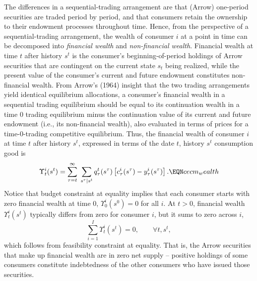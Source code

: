 The differences in a sequential-trading arrangement are that (Arrow)
one-period securities are traded period by period, and that consumers
retain the ownership to their endowment processes throughout time.
Hence, from the perspective of a sequential-trading arrangement, the
wealth of consumer $i$ at a point in time can be decomposed into  {\it financial wealth} and
 {\it non-financial wealth}.
Financial wealth at time $t$ after history $s^t$ is the consumer's
beginning-of-period holdings of Arrow securities that are contingent on
the current state $s_t$ being realized,
while the present value of the consumer's current and future endowment constitutes non-financial
wealth. From Arrow's (1964) insight that the two trading arrangements
yield  identical equilibrium allocations, a consumer's financial wealth
in a sequential trading equilibrium should be equal to its
continuation wealth in a time $0$ trading equilibrium minus the continuation value of
its current and future endowment
(i.e., its non-financial wealth), also evaluated in terms of prices for a time-$0$-trading competitive equilibrium. Thus, the
financial wealth of consumer $i$ at time $t$ after history $s^t$,
expressed in terms of the date $t$, history $s^t$ consumption good is
$$
\Upsilon^i_t(s^t) =
\sum_{\tau=t}^\infty \; \sum_{s^\tau \vert s^t}
    q_\tau^t(s^\tau) \left[ c^i_\tau(s^\tau) - y_\tau^i(s^\tau) \right]. \EQN cecm_wealth$$
Notice that budget constraint  at equality implies that
each consumer starts  with zero financial wealth at time $0$,
$\Upsilon^i_0(s^0)=0$ for all $i$. At $t >0$, financial wealth
$\Upsilon^i_t(s^t)$ typically differs from zero for consumer $i$,
but it sums to zero across $i$,
$$
\sum_{i=1}^{I}  \Upsilon^i_t(s^t) = 0, \qquad \forall t, s^t,
$$
which follows from feasibility constraint  at equality.
That is, the  Arrow securities that make up financial
wealth are in zero net supply -- positive holdings of some consumers
constitute indebtedness of the other consumers who have issued those
securities.





